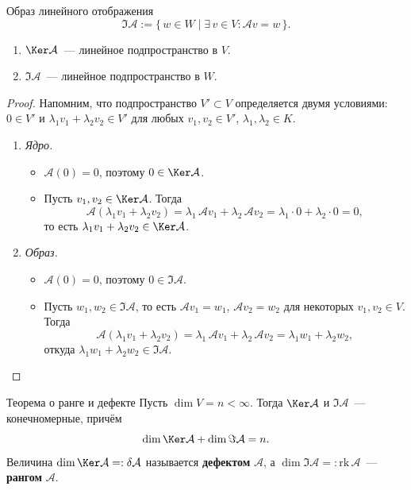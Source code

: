 \begin{Definition}{Образ линейного отображения}{}
	\[
	\Im\mathcal{A} := \{\, w \in W \mid \exists\, v \in V \colon \mathcal{A}v = w \,\}.
	\]
\end{Definition}

\begin{Proposition}{}{}
	\begin{enumerate}
		\item $\Ker\mathcal{A}$~--- линейное подпространство в $V$.
		\item $\Im\mathcal{A}$~--- линейное подпространство в $W$.
	\end{enumerate}
\end{Proposition}

\begin{proof}
	Напомним, что подпространство $V' \subset V$ определяется двумя условиями:
	$0 \in V'$ и $\lambda_1 v_1 + \lambda_2 v_2 \in V'$ для любых $v_1, v_2 \in V'$, $\lambda_1, \lambda_2 \in K$.
	
	\begin{enumerate}
		\item \textit{Ядро.}
		\begin{itemize}
			\item $\mathcal{A}(0) = 0$, поэтому $0 \in \Ker\mathcal{A}$.
			\item Пусть $v_1, v_2 \in \Ker\mathcal{A}$. Тогда
			\[
			\mathcal{A}(\lambda_1 v_1 + \lambda_2 v_2)
			= \lambda_1\,\mathcal{A}v_1 + \lambda_2\,\mathcal{A}v_2
			= \lambda_1 \cdot 0 + \lambda_2 \cdot 0 = 0,
			\]
			то есть $\lambda_1 v_1 + \lambda_2 v_2 \in \Ker\mathcal{A}$.
		\end{itemize}
		\item \textit{Образ.}
		\begin{itemize}
			\item $\mathcal{A}(0) = 0$, поэтому $0 \in \Im\mathcal{A}$.
			\item Пусть $w_1, w_2 \in \Im\mathcal{A}$, то есть $\mathcal{A}v_1 = w_1$, $\mathcal{A}v_2 = w_2$ для некоторых $v_1, v_2 \in V$. Тогда
			\[
			\mathcal{A}(\lambda_1 v_1 + \lambda_2 v_2)
			= \lambda_1\,\mathcal{A}v_1 + \lambda_2\,\mathcal{A}v_2
			= \lambda_1 w_1 + \lambda_2 w_2,
			\]
			откуда $\lambda_1 w_1 + \lambda_2 w_2 \in \Im\mathcal{A}$.
		\end{itemize}
	\end{enumerate}
\end{proof}

\begin{Proposition}{Теорема о ранге и дефекте}{}
	Пусть $\dim V = n < \infty$. Тогда $\Ker\mathcal{A}$ и $\Im\mathcal{A}$~--- конечномерные, причём
	\[
	\dim\Ker\mathcal{A} + \dim\Im\mathcal{A} = n.
	\]
	Величина $\dim\Ker\mathcal{A} =: \delta\mathcal{A}$ называется \textbf{дефектом} $\mathcal{A}$,
	а $\dim\Im\mathcal{A} =: \mathrm{rk}\,\mathcal{A}$~--- \textbf{рангом} $\mathcal{A}$.
\end{Proposition}

